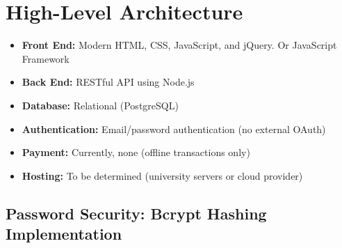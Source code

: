 \documentclass[12pt,a4paper]{article}
\begin{document}
\newpage

\section{High-Level Architecture}

\begin{tcolorbox}[colback=primaryblue!5, colframe=primaryblue, boxrule=1pt, arc=3pt, left=10pt, right=10pt, top=8pt, bottom=8pt]
\begin{itemize}[leftmargin=2em, itemsep=10pt]
    \item \textbf{Front End:} Modern HTML, CSS, JavaScript, and jQuery. Or JavaScript Framework  
    \item \textbf{Back End:} RESTful API using Node.js
    \item \textbf{Database:} Relational (PostgreSQL)
    \item \textbf{Authentication:} Email/password authentication (no external OAuth)
    \item \textbf{Payment:} Currently, none (offline transactions only)
    \item \textbf{Hosting:} To be determined (university servers or cloud provider)
\end{itemize}
\end{tcolorbox}

\newpage

\subsection{Password Security: Bcrypt Hashing Implementation}
\end{document}
